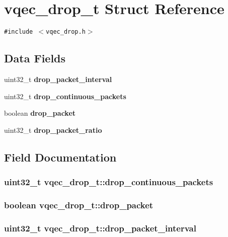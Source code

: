 \section{vqec\_\-drop\_\-t Struct Reference}
\label{structvqec__drop__t}
{\tt \#include $<$vqec\_\-drop.h$>$}

\subsection*{Data Fields}
\begin{CompactItemize}
\item 
uint32\_\-t \bf{drop\_\-packet\_\-interval}
\item 
uint32\_\-t \bf{drop\_\-continuous\_\-packets}
\item 
boolean \bf{drop\_\-packet}
\item 
uint32\_\-t \bf{drop\_\-packet\_\-ratio}
\end{CompactItemize}


\subsection{Field Documentation}
\subsubsection{\setlength{\rightskip}{0pt plus 5cm}uint32\_\-t \bf{vqec\_\-drop\_\-t::drop\_\-continuous\_\-packets}}\label{structvqec__drop__t_0643275f81798bcf45ac25db2fbfb096}


\subsubsection{\setlength{\rightskip}{0pt plus 5cm}boolean \bf{vqec\_\-drop\_\-t::drop\_\-packet}}\label{structvqec__drop__t_4f8181242bf7dba44509cbd528a94aad}


\subsubsection{\setlength{\rightskip}{0pt plus 5cm}uint32\_\-t \bf{vqec\_\-drop\_\-t::drop\_\-packet\_\-interval}}\label{structvqec__drop__t_9dcb7f7f8ea63b68c1852dd6d0775aa1}



